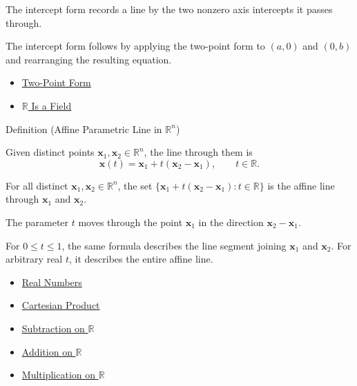 \begin{remark*}[Interpretation]
The intercept form records a line by the two nonzero axis intercepts it
passes through.
\end{remark*}

\begin{remark*}[Exposition]
The intercept form follows by applying the two-point form to $(a,0)$ and
$(0,b)$ and rearranging the resulting equation.
\end{remark*}

\begin{dependencies}
\begin{itemize}
  \item \hyperref[def:two-point-form]{Two-Point Form}
  \item \hyperref[thm:r-is-a-field]{$\mathbb{R}$ Is a Field}
\end{itemize}
\end{dependencies}

\begin{definitionbox}{Definition (Affine Parametric Line in $\mathbb{R}^n$)}
\begin{definition}\label{def:affine-parametric-line}
Given distinct points $\mathbf x_1,\mathbf x_2\in\mathbb{R}^n$, the line
through them is
\[
  \mathbf x(t)=\mathbf x_1+t(\mathbf x_2-\mathbf x_1),
  \qquad t\in\mathbb{R}.
\]
\end{definition}
\end{definitionbox}

\begin{remark*}
For all distinct $\mathbf x_1,\mathbf x_2\in\mathbb{R}^n$, the set
$\{\mathbf x_1+t(\mathbf x_2-\mathbf x_1):t\in\mathbb{R}\}$ is the affine
line through $\mathbf x_1$ and $\mathbf x_2$.
\end{remark*}

\begin{remark*}[Interpretation]
The parameter $t$ moves through the point $\mathbf x_1$ in the direction
$\mathbf x_2-\mathbf x_1$.
\end{remark*}

\begin{remark*}[Exposition]
For $0\le t\le 1$, the same formula describes the line segment joining
$\mathbf x_1$ and $\mathbf x_2$. For arbitrary real $t$, it describes the
entire affine line.
\end{remark*}

\begin{dependencies}
\begin{itemize}
  \item \hyperref[def:reals]{Real Numbers}
  \item \hyperref[def:cartesian-product]{Cartesian Product}
  \item \hyperref[def:subtraction-on-r]{Subtraction on $\mathbb{R}$}
  \item \hyperref[def:addition-on-r]{Addition on $\mathbb{R}$}
  \item \hyperref[def:multiplication-on-r]{Multiplication on $\mathbb{R}$}
\end{itemize}
\end{dependencies}

